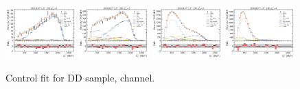 \begin{figure}[htb]
    \includegraphics[width=0.24\textwidth]{./figs-fit-fit-results/ctrl-fit/lines_q2_slices/fit_result-lines_q2_idx1-Dst-dd-el.pdf}
    \includegraphics[width=0.24\textwidth]{./figs-fit-fit-results/ctrl-fit/lines_q2_slices/fit_result-lines_q2_idx2-Dst-dd-el.pdf}
    \includegraphics[width=0.24\textwidth]{./figs-fit-fit-results/ctrl-fit/lines_q2_slices/fit_result-lines_q2_idx3-Dst-dd-el.pdf}
    \includegraphics[width=0.24\textwidth]{./figs-fit-fit-results/ctrl-fit/lines_q2_slices/fit_result-lines_q2_idx4-Dst-dd-el.pdf}

    \caption{Control fit for DD sample, \Dstar channel.}
    \label{fig:ctrl-dd-dst}
\end{figure}

